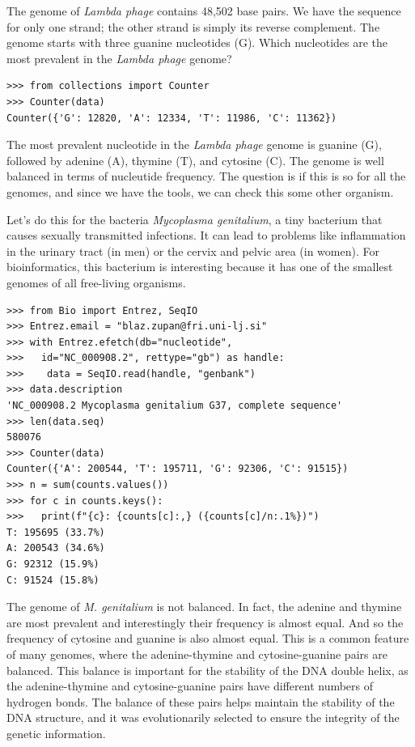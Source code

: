 The genome of {\em Lambda phage} contains 48,502 base pairs. We have the sequence for only one strand; the other strand is simply its reverse complement. The genome starts with three guanine nucleotides (G). Which nucleotides are the most prevalent in the {\em Lambda phage} genome?

\vspace*{3mm}
\begin{lstlisting}
>>> from collections import Counter
>>> Counter(data)
Counter({'G': 12820, 'A': 12334, 'T': 11986, 'C': 11362})
\end{lstlisting}

The most prevalent nucleotide in the {\em Lambda phage} genome is guanine (G), followed by adenine (A), thymine (T), and cytosine (C). The genome is well balanced in terms of nucleutide frequency. The question is if this is so for all the genomes, and since we have the tools, we can check this some other organism. 

Let's do this for the bacteria {\em Mycoplasma genitalium}, a tiny bacterium that causes sexually transmitted infections. It can lead to problems like inflammation in the urinary tract (in men) or the cervix and pelvic area (in women). For bioinformatics, this bacterium is interesting because it has one of the smallest genomes of all free-living organisms.

\vspace*{3mm}
\begin{lstlisting}
>>> from Bio import Entrez, SeqIO
>>> Entrez.email = "blaz.zupan@fri.uni-lj.si"
>>> with Entrez.efetch(db="nucleotide", 
>>>   id="NC_000908.2", rettype="gb") as handle:
>>>    data = SeqIO.read(handle, "genbank")
>>> data.description
'NC_000908.2 Mycoplasma genitalium G37, complete sequence'
>>> len(data.seq)
580076
>>> Counter(data)
Counter({'A': 200544, 'T': 195711, 'G': 92306, 'C': 91515})
>>> n = sum(counts.values())
>>> for c in counts.keys():
>>>   print(f"{c}: {counts[c]:,} ({counts[c]/n:.1%})")
T: 195695 (33.7%)
A: 200543 (34.6%)
G: 92312 (15.9%)
C: 91524 (15.8%)
\end{lstlisting}

The genome of {\em M. genitalium} is not balanced. In fact, the adenine and thymine are most prevalent and interestingly their frequency is almost equal. And so the frequency of cytosine and guanine is also almost equal. This is a common feature of many genomes, where the adenine-thymine and cytosine-guanine pairs are balanced. This balance is important for the stability of the DNA double helix, as the adenine-thymine and cytosine-guanine pairs have different numbers of hydrogen bonds. The balance of these pairs helps maintain the stability of the DNA structure, and it was evolutionarily selected to ensure the integrity of the genetic information.

